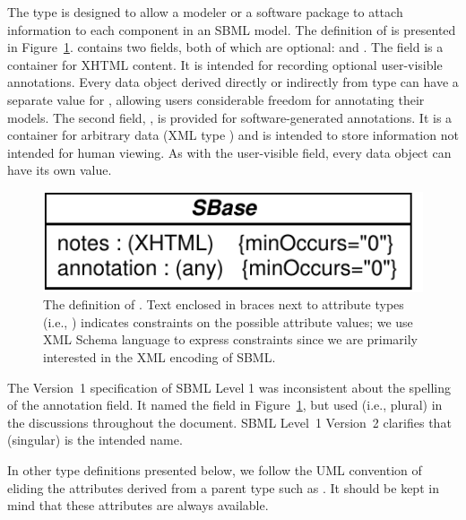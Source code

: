 \documentclass[10pt]{cekarticle}
\newcommand{\vref}[1]{\ref{#1}}
\newcommand{\changed}[1]{\textcolor{BrickRed}{#1}}
\begin{document}
The type  is designed to allow a modeler or a software package
to attach information to each component in an SBML model.  The definition
of  is presented in Figure~\vref{fig:identified}.
 contains two fields, both of which are optional:
 and \changed{}.  The field 
is a container for XHTML content.  It is intended for recording optional
user-visible annotations.  Every data object derived directly or indirectly
from type  can have a separate value for ,
allowing users considerable freedom for annotating their models.  The
second field, \changed{}, is provided for
software-generated annotations.  It is a container for arbitrary data (XML
type ) and is intended to store information not intended for
human viewing.  As with the user-visible  field, every data
object can have its own \changed{} value.

\begin{figure}[thb]
  \centering
  \includegraphics[scale = 0.65]{figs/identified}
  \caption{The definition of .  Text enclosed in braces next
    to attribute types (i.e., ) indicates
    constraints on the possible attribute values; we use XML Schema
    language to express constraints since we are primarily interested in
    the XML encoding of SBML.}
  \label{fig:identified}
\end{figure}

\changed{The Version~1 specification of SBML Level 1 was inconsistent about
  the spelling of the annotation field.  It named the field
  \attrib{annotation} in Figure~\ref{fig:identified}, but used
  \attrib{annotations} (i.e., plural) in the discussions throughout the
  document.  SBML Level~1 Version~2 clarifies that \attrib{annotation} (singular) is the
  intended name.}

In other type definitions presented below, we follow the UML convention of
eliding the attributes derived from a parent type such as .
It should be kept in mind that these attributes are always available.
\end{document}
